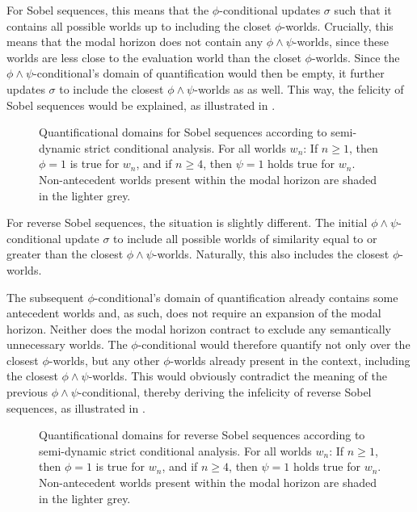 For Sobel sequences, this means that the $\phi$-conditional updates $\sigma$ such that it contains all possible worlds up to including the closet $\phi$-worlds. Crucially, this means that the modal horizon does not contain any $\phi\land\psi$-worlds, since these worlds are less close to the evaluation world than the closet $\phi$-worlds. Since the $\phi\land\psi$-conditional's domain of quantification would then be empty, it further updates $\sigma$ to include the closest $\phi\land\psi$-worlds as as well. This way, the felicity of Sobel sequences would be explained, as illustrated in .
\begin{figure}[!htb]

\caption{Quantificational domains for Sobel sequences according to  semi-dynamic strict conditional analysis. For all worlds $w_n$: If $n\geqslant1$, then $\phi=1$ is true for $w_n$, and if $n\geqslant 4$, then $\psi=1$ holds true for $w_n$. Non-antecedent worlds present within the modal horizon are shaded in the lighter grey.}
\end{figure}

For reverse Sobel sequences, the situation is slightly different. The initial $\phi\land\psi$-conditional update $\sigma$ to include all possible worlds of similarity equal to or greater than the closest $\phi\land\psi$-worlds. Naturally, this also includes the closest $\phi$-worlds. 

The subsequent $\phi$-conditional's domain of quantification already contains some antecedent worlds and, as such, does not require an expansion of the modal horizon. Neither does the modal horizon contract to exclude any semantically unnecessary worlds. The $\phi$-conditional would therefore quantify not only over the closest $\phi$-worlds, but any other $\phi$-worlds already present in the context, including the closest $\phi\land\psi$-worlds. This would obviously contradict the meaning of the previous $\phi\land\psi$-conditional, thereby deriving the infelicity of reverse Sobel sequences, as illustrated in .
\begin{figure}[!htb]

\caption{Quantificational domains for reverse Sobel sequences according to  semi-dynamic strict conditional analysis. For all worlds $w_n$: If $n\geqslant1$, then $\phi=1$ is true for $w_n$, and if $n\geqslant 4$, then $\psi=1$ holds true for $w_n$. Non-antecedent worlds present within the modal horizon are shaded in the lighter grey.}
\end{figure}


